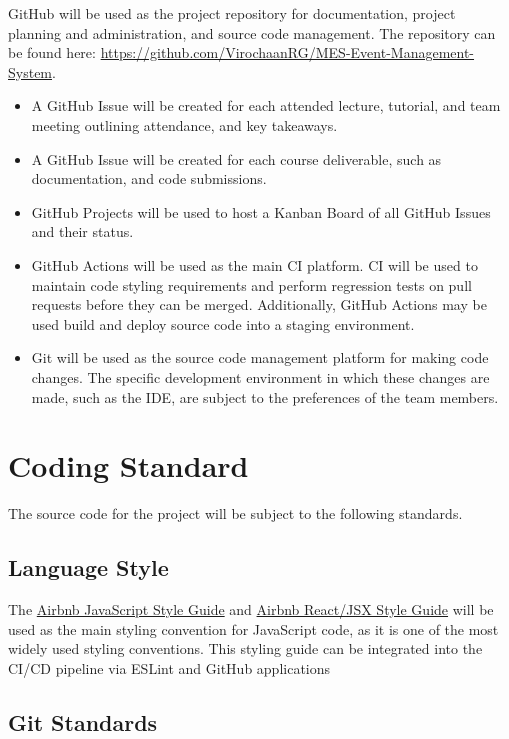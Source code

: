 \documentclass{article}
\begin{document}
\begin{flushleft}
GitHub will be used as the project repository for documentation, project planning and administration, and source code management. The repository can be found here: \url{https://github.com/VirochaanRG/MES-Event-Management-System}.
\begin{itemize}
    \item A GitHub Issue will be created for each attended lecture, tutorial, and team meeting outlining attendance, and key takeaways. 
    \item A GitHub Issue will be created for each course deliverable, such as documentation, and code submissions.
    \item GitHub Projects will be used to host a Kanban Board of all GitHub Issues and their status.
    \item GitHub Actions will be used as the main CI platform. CI will be used to maintain code styling requirements and perform regression tests on pull requests before they can be merged. 
    Additionally, GitHub Actions may be used build and deploy source code into a staging environment.
    \item Git will be used as the source code management platform for making code changes. The specific development environment in which these changes are made, such as the IDE, are subject to the preferences of the team members.
\end{itemize}
\end{flushleft}

\section{Coding Standard}

The source code for the project will be subject to the following standards.

\subsection{Language Style}

The \href{https://github.com/airbnb/javascript}{Airbnb JavaScript Style Guide} and \href{https://github.com/airbnb/javascript/tree/master/react}{Airbnb React/JSX Style Guide} will be used as the main styling convention for JavaScript code, as it is one of the most widely used styling conventions. This styling guide can be integrated into the CI/CD pipeline via ESLint and GitHub applications

\subsection{Git Standards} 
\end{document}
